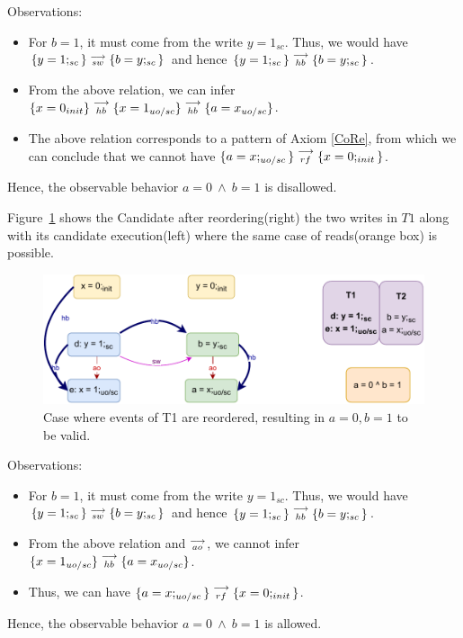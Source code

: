         Observations:
        \begin{itemize}
            \item For $b=1$, it must come from the write $y=1_{sc}$. 
            Thus, we would have $\{y=1;_{sc}\}\stackrel{\longrightarrow}{_{sw}}\{b=y;_{sc}\}$ and hence $\{y=1;_{sc}\}\stackrel{\longrightarrow}{_{hb}}\{b=y;_{sc}\}$.
            \item From the above relation, we can infer $\{x=0_{init}\}\stackrel{\longrightarrow}{_{hb}}\{x=1_{uo/sc}\}\stackrel{\longrightarrow}{_{hb}}\{a=x_{uo/sc}\}$.
            \item The above relation corresponds to a pattern of Axiom \ref{CoRe}, from which we can conclude that we cannot have $\{a=x;_{uo/sc}\}\stackrel{\longrightarrow}{_{rf}}\{x=0;_{init}\}$.
        \end{itemize}
        Hence, the observable behavior $a=0 \ \wedge \ b=1$ is disallowed.

        Figure~\ref{reord_counter:example4(b)} shows the Candidate after reordering(right) the two writes in $T1$ along with its candidate execution(left) where the same case of reads(orange box) is possible. 
        \begin{figure}[H]
            \centering
            \includegraphics[scale=0.7]{7.CounterExamples/ReorderingCandidate/Example7R(Wuo,sc-Wsc).pdf}
            \caption{Case where events of T1 are reordered, resulting in $a = 0,  b = 1$ to be valid.}
            \label{reord_counter:example4(b)}
        \end{figure}
        
        Observations:
        \begin{itemize}
            \item For $b=1$, it must come from the write $y=1_{sc}$. 
            Thus, we would have $\{y=1;_{sc}\}\stackrel{\longrightarrow}{_{sw}}\{b=y;_{sc}\}$ and hence $\{y=1;_{sc}\}\stackrel{\longrightarrow}{_{hb}}\{b=y;_{sc}\}$.
            \item From the above relation and $\stackrel{\longrightarrow}{_{ao}}$, we cannot infer $\{x=1_{uo/sc}\}\stackrel{\longrightarrow}{_{hb}}\{a=x_{uo/sc}\}$.
            \item Thus, we can have  $\{a=x;_{uo/sc}\}\stackrel{\longrightarrow}{_{rf}}\{x=0;_{init}\}$.
        \end{itemize}
        Hence, the observable behavior $a=0 \ \wedge \ b=1$ is allowed.